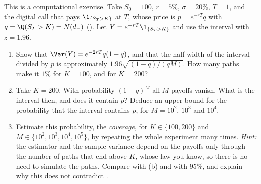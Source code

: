 
\begin{exercise}\label{ex:num-coverage}
\easy This is a computational exercise. Take $S_0=100$, $r=5\%$, $\sigma=20\%$, $T=1$, and the digital
call that pays $\1_{\{S_T>K\}}$ at $T$, whose price is $p=e^{-rT}q$ with $q=\Q(S_T>K)=N(d_-)$
(). Let $Y=e^{-rT}\1_{\{S_T>K\}}$ and use the interval
 with $z=1.96$.
\begin{enumerate}[label=(\alph*)]
  \item Show that $\Var(Y)=e^{-2rT}q(1-q)$, and that the half-width of the interval divided by $p$ is
    approximately $1.96\sqrt{(1-q)/(qM)}$. How many paths make it $1\%$ for $K=100$, and for $K=200$?
  \item Take $K=200$. With probability $(1-q)^M$ all $M$ payoffs vanish. What is the interval then,
    and does it contain $p$? Deduce an upper bound for the probability that the interval contains $p$,
    for $M=10^2$, $10^3$ and $10^4$.
  \item Estimate this probability, the \emph{coverage}, for $K\in\{100,200\}$ and
    $M\in\{10^2,10^3,10^4,10^5\}$, by repeating the whole experiment many times. \emph{Hint:} the estimator
    and the sample variance depend on the payoffs only through the number of paths that end above
    $K$, whose law you know, so there is no need to simulate the paths. Compare with (b) and with
    $95\%$, and explain why this does not contradict .
\end{enumerate}
\end{exercise}

